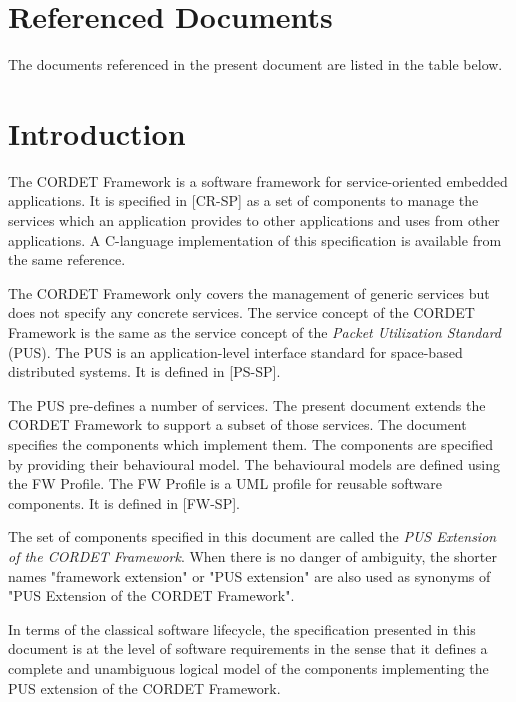 \documentclass{pnp_article}
\begin{document}
\newpage

\section{Referenced Documents}

The documents referenced in the present document are listed in the table below.

\listofreferencedocs{\PxSp}



\newpage


\section{Introduction}
The CORDET Framework is a software framework for service-oriented embedded applications. It is specified in [CR-SP] as a set of components to manage the services which an application provides to other applications and uses from other applications. A C-language implementation of this specification is available from the same reference.

The CORDET Framework only covers the management of generic services but does not specify any concrete services. The service concept of the CORDET Framework is the same as the service concept of the \textit{Packet Utilization Standard} (PUS). The PUS is an application-level interface standard for space-based distributed systems. It is defined in [PS-SP].

The PUS pre-defines a number of services. The present document extends the CORDET Framework to support a subset of those services. The document specifies the components which implement them. The components are specified by providing their behavioural model. The behavioural models are defined using the FW Profile. The FW Profile is a UML profile for reusable software components. It is defined in [FW-SP].

The set of components specified in this document are called the \textit{PUS Extension of the CORDET Framework}. When there is no danger of ambiguity, the shorter names "framework extension" or "PUS extension" are also used as synonyms of "PUS Extension of the CORDET Framework".

In terms of the classical software lifecycle, the specification presented in this document is at the level of software requirements in the sense that it defines a complete and unambiguous logical model of the components implementing the PUS extension of the CORDET Framework.
\end{document}
